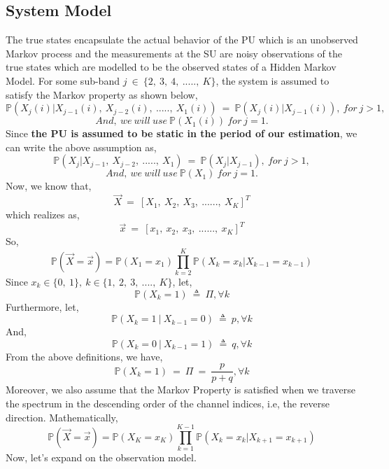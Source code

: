 \documentclass[12pt, draftcls, onecolumn]{IEEEtran}
\begin{document}
\subsection{System Model}
The true states encapsulate the actual behavior of the PU which is an unobserved Markov process and the measurements at the SU are noisy observations of the true states which are modelled to be the observed states of a Hidden Markov Model.
For some sub-band $j\ \in\ \{2,\ 3,\ 4,\ .....,\ K\}$, the system is assumed to satisfy the Markov property as shown below,
\[\mathbb P(X_{j}(i)|X_{j-1}(i),\ X_{j-2}(i),\ .....,\ X_1(i))\ =\ \mathbb P(X_{j}(i)|X_{j-1}(i)),\ for\ j>1,\]
\[And,\ we\ will\ use\ \mathbb P(X_1(i))\ for\ j=1.\]
Since \textbf{the PU is assumed to be static in the period of our estimation}, we can write the above assumption as,
\[\mathbb P(X_{j}|X_{j-1},\ X_{j-2},\ .....,\ X_1)\ =\ \mathbb P(X_{j}|X_{j-1}),\ for\ j>1,\]
\[And,\ we\ will\ use\ \mathbb P(X_1)\ for\ j=1.\]
Now, we know that,
\[\vec{X}\ =\ [X_1,\ X_2,\ X_3,\ ......,\ X_K]^T\] which realizes as,
\[\vec{x}\ =\ [x_1,\ x_2,\ x_3,\ ......,\ x_K]^T\]
So,
\begin{equation}\label{4}
    \mathbb P(\vec{X}=\vec{x}) = \mathbb P(X_1=x_1) \prod_{k=2}^{K} \mathbb P(X_k=x_k|X_{k-1}=x_{k-1})
\end{equation}
Since $x_k \in \{0,\ 1\},\ k \in \{1,\ 2,\ 3,\ ....,\ K\}$, let,
\begin{equation*}
    \mathbb P(X_k=1)\ \triangleq\ \Pi, \forall k
\end{equation*}
Furthermore, let, 
\begin{equation*}
    \mathbb P(X_k=1\ |\ X_{k-1}=0)\ \triangleq\ p, \forall k
\end{equation*}
And,
\begin{equation*}
    \mathbb P(X_k=0\ |\ X_{k-1}=1)\ \triangleq\ q, \forall k
\end{equation*}
From the above definitions, we have,
\begin{equation*}
    \mathbb P(X_k=1)\ =\ \Pi\ =\ \frac{p}{p+q}, \forall k
\end{equation*}
Moreover, we also assume that the Markov Property is satisfied when we traverse the spectrum in the descending order of the channel indices, i.e, the reverse direction. Mathematically,
\begin{equation*}
\mathbb P(\vec{X}=\vec{x})=\mathbb P(X_K=x_K)\prod_{k=1}^{K-1} \mathbb P(X_{k}=x_k|X_{k+1}=x_{k+1})
\end{equation*}
Now, let's expand on the observation model.
\end{document}
